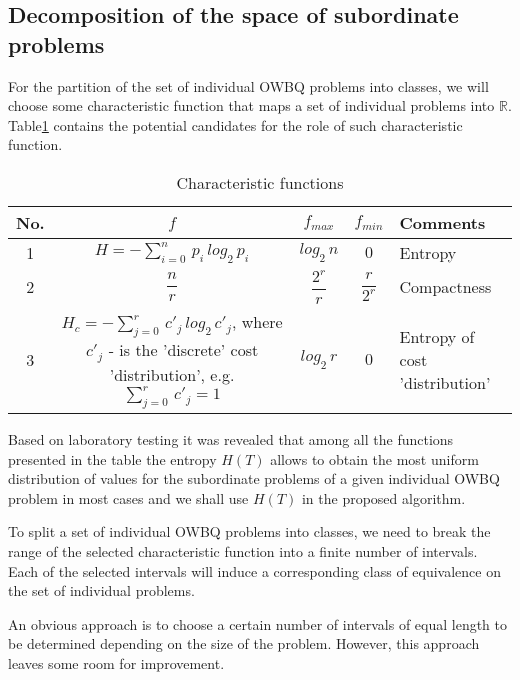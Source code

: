 \documentclass[11pt]{article}
\newcommand{\PreserveBackslash}[1]{\let\temp=\\#1\let\\=\temp}
\let\PBS=\PreserveBackslash
\begin{document}
%
%
%
\subsection{Decomposition of the space of subordinate problems}
For the partition of the set of individual OWBQ problems into classes, we will choose some characteristic function that maps a set of individual problems into $\mathbb{R}$. Table\ref{tab:5} contains the potential candidates for the role of such characteristic function. 

\renewcommand\arraystretch{2.3}
\begin{table}[ht]
\begin{center}
\begin{tabular}{|c||c|c|c|l|} \hline
\textsf{No.} & $f$ &  $f_{max}$ & $f_{min}$ & \textsf{Comments} \\ \hline\hline
1 & $H=-\sum_{i=0}^n\,p_i\,log_2\,p_i$ & $log_2\,n$ & $0$ & Entropy \\ \hline
2 & $\dfrac{n}{r}$ & $\dfrac{2^r}{r}$ & $\dfrac{r}{2^r}$ & Compactness \\ \hline
3 & \multicolumn{1}{m{55mm}|}{$H_c=-\sum_{j=0}^r\,c'_j\,log_2\,c'_j$, where $c'_j$ - is the 'discrete' cost 'distribution', e.g. $\sum_{j=0}^r\,c'_j=1$}
& $log_2\,r$ & $0$ & \multicolumn{1}{m{45mm}|}{Entropy of cost 'distribution'}  \\ \hline
\end{tabular}
\end{center}
\caption{Characteristic functions\label{tab:5}}
\end{table}
\renewcommand\arraystretch{1}

Based on laboratory testing it was revealed that among all the functions presented in the table the entropy $H(T)$ allows to obtain the most uniform distribution of values for the subordinate problems of a given individual OWBQ problem in most cases and we shall use $H(T)$ in the proposed algorithm.

To split a set of individual OWBQ problems into classes, we need to break the range of the selected characteristic function into a finite number of intervals. Each of the selected intervals will induce a corresponding class of equivalence on the set of individual problems.

An obvious approach is to choose a certain number of intervals of equal length to be determined depending on the size of the problem. However, this approach leaves some room for improvement.
\end{document}
